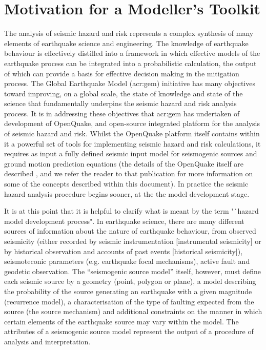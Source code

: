 \section{Motivation for a Modeller's Toolkit}

The analysis of seismic hazard and risk represents a complex synthesis of many elements of earthquake science and engineering. The knowledge of earthquake behaviour is effectively distilled into a framework in which effective models of the earthquake process can be integrated into a probabilistic calculation, the output of which can provide a basis for effective decision making in the mitigation process. The Global Earthquake Model (\gls{acr:gem}) initiative has many objectives toward improving, on a global scale, the state of knowledge and state of the science that fundamentally underpins the seismic hazard and risk analysis process. It is in addressing these objectives that \gls{acr:gem} has undertaken of development of OpenQuake, and open-source integrated platform for the analysis of seismic hazard and risk. Whilst the OpenQuake platform itself contains within it a powerful set of tools for implementing seismic hazard and risk calculations, it requires as input a fully defined seismic input model for seismogenic sources and ground motion prediction equations (the details of the OpenQuake itself are described \cite{crowley2011}, and we refer the reader to that publication for more information on some of the concepts described within this document). In practice the seismic hazard analysis procedure begins sooner, at the the model development stage. 

It is at this point that it is helpful to clarify what is meant by the term "`hazard model development process". In earthquake science, there are many different sources of information about the nature of earthquake behaviour, from observed seismicity (either recorded by seismic instrumentation [instrumental seismicity] or by historical observation and accounts of past events [historical seismicity]), seismoteconic parameters (e.g. earthquake focal mechanisms), active fault and geodetic observation. The "`seismogenic source model"' itself, however, must define each seismic source by a geometry (point, polygon or plane), a model describing the probability of the source generating an earthquake with a given magnitude (recurrence model), a characterisation of the type of faulting expected from the source (the source mechanism) and additional constraints on the manner in which certain elements of the earthquake source may vary within the model. The attributes of a seismogenic source model represent the output of a procedure of analysis and interpretation. 

